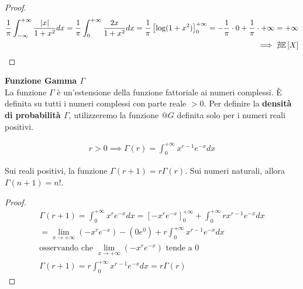 \begin{defn}
    \begin{proof}
        \begin{equation*}
            \begin{aligned}
                \frac{1}{\pi} \int_{-\infty}^{+\infty} \frac{\lvert x\rvert{}}{1 + x^2} dx = \frac{1}{\pi} \int_{0}^{+\infty} \frac{2x}{1 + x^2} dx =
                \frac{1}{\pi} \left[ \log(1 + x^2) \right]_{0}^{+\infty} = - \frac{1}{\pi} \cdot 0 + \frac{1}{\pi} \cdot +\infty = +\infty \\
                \implies \nexists \mathbb{E}\left[X\right]
            \end{aligned}
        \end{equation*}
    \end{proof}
\end{defn}

\begin{defn}
    \textbf{Funzione Gamma $\Gamma$} \\
    La funzione $\Gamma$ è un'estensione della funzione fattoriale ai numeri
    complessi. È definita su tutti i numeri complessi con parte reale $> 0$.
    Per definire la \textbf{densità di probabilità $\Gamma$}, utilizzeremo la
    funzione $@G$ definita solo per i numeri reali positivi.

    \begin{equation*}
        \begin{aligned}
            r > 0 \implies \Gamma(r) = \int_{0}^{+\infty} x^{r - 1}e^{-x} dx
        \end{aligned}
    \end{equation*}

    \begin{prop}
        Sui reali positivi, la funzione $\Gamma(r+1) = r\Gamma(r)$. Sui numeri
        naturali, allora $\Gamma(n+1) = n!$.
    \end{prop}

    \begin{proof}
        \begin{equation*}
            \begin{aligned}
                \Gamma(r+1) = \int_{0}^{+\infty} x^r e^{-x} dx = \left[ -x^r e^{-x} \right]_{0}^{+\infty} + \int_{0}^{+\infty} rx^{r-1} e^{-x} dx \\
                = \lim_{x \to +\infty} (-x^r e^{-x}) - (0e^0) + r \int_{0}^{+\infty} x^{r-1} e^{-x} dx \\
                \text{osservando che $\lim_{x \to +\infty} (-x^r e^{-x})$ tende a 0} \\
                \Gamma(r+1) = r \int_{0}^{+\infty} x^{r-1} e^{-x} dx = r \Gamma(r)
            \end{aligned}
        \end{equation*}
    \end{proof}
    

\end{defn}
